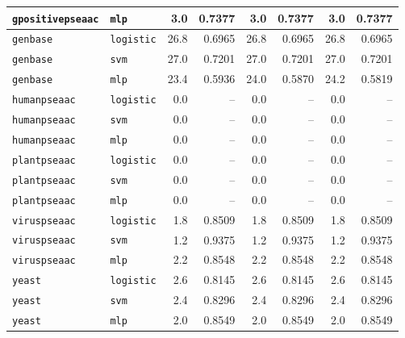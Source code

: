 \documentclass[11pt,a4paper]{article}
\begin{document}
\begin{table}[htbp]
{\begin{tabular}{l l r r r r r r}
\texttt{gpositivepseaac} & \texttt{mlp} & 3.0 & 0.7377 & 3.0 & 0.7377 & 3.0 & 0.7377 \\
\midrule
\texttt{genbase} & \texttt{logistic} & 26.8 & 0.6965 & 26.8 & 0.6965 & 26.8 & 0.6965 \\
\texttt{genbase} & \texttt{svm} & 27.0 & 0.7201 & 27.0 & 0.7201 & 27.0 & 0.7201 \\
\texttt{genbase} & \texttt{mlp} & 23.4 & 0.5936 & 24.0 & 0.5870 & 24.2 & 0.5819 \\
\midrule
\texttt{humanpseaac} & \texttt{logistic} & 0.0 & -- & 0.0 & -- & 0.0 & -- \\
\texttt{humanpseaac} & \texttt{svm} & 0.0 & -- & 0.0 & -- & 0.0 & -- \\
\texttt{humanpseaac} & \texttt{mlp} & 0.0 & -- & 0.0 & -- & 0.0 & -- \\
\midrule
\texttt{plantpseaac} & \texttt{logistic} & 0.0 & -- & 0.0 & -- & 0.0 & -- \\
\texttt{plantpseaac} & \texttt{svm} & 0.0 & -- & 0.0 & -- & 0.0 & -- \\
\texttt{plantpseaac} & \texttt{mlp} & 0.0 & -- & 0.0 & -- & 0.0 & -- \\
\midrule
\texttt{viruspseaac} & \texttt{logistic} & 1.8 & 0.8509 & 1.8 & 0.8509 & 1.8 & 0.8509 \\
\texttt{viruspseaac} & \texttt{svm} & 1.2 & 0.9375 & 1.2 & 0.9375 & 1.2 & 0.9375 \\
\texttt{viruspseaac} & \texttt{mlp} & 2.2 & 0.8548 & 2.2 & 0.8548 & 2.2 & 0.8548 \\
\midrule
\texttt{yeast} & \texttt{logistic} & 2.6 & 0.8145 & 2.6 & 0.8145 & 2.6 & 0.8145 \\
\texttt{yeast} & \texttt{svm} & 2.4 & 0.8296 & 2.4 & 0.8296 & 2.4 & 0.8296 \\
\texttt{yeast} & \texttt{mlp} & 2.0 & 0.8549 & 2.0 & 0.8549 & 2.0 & 0.8549 \\
\bottomrule
\end{tabular}%
}
\end{table}
\end{document}
